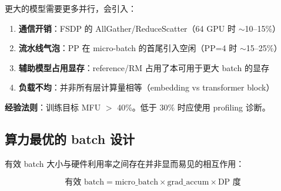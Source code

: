 \begin{intuitionbox}
更大的模型需要更多并行，会引入：

\begin{enumerate}
  \item \textbf{通信开销}：FSDP 的 AllGather/ReduceScatter（64 GPU 时 $\sim$10--15\%）
  \item \textbf{流水线气泡}：PP 在 micro-batch 的首尾引入空闲（PP=4 时 $\sim$15--25\%）
  \item \textbf{辅助模型占用显存}：reference/RM 占用了本可用于更大 batch 的显存
  \item \textbf{负载不均}：并非所有层计算量相等（embedding vs transformer block）
\end{enumerate}

\textbf{经验法则}：训练目标 MFU $>$ 40\%。低于 30\% 时应使用 profiling 诊断。
\end{intuitionbox}

\subsection{算力最优的 batch 设计}
\label{compute-optimal-batch-sizing}

有效 batch 大小与硬件利用率之间存在并非显而易见的相互作用：

\begin{equation}
\text{有效 batch} = \text{micro\_batch} \times \text{grad\_accum} \times \text{DP 度}
\end{equation}

